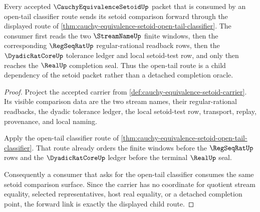 \begin{theorem}
\label{thm:cauchy-equivalence-setoid-open-tail-forward-link}
Every accepted $\CauchyEquivalenceSetoidUp$ packet that is consumed by an open-tail classifier route sends its setoid comparison forward through the displayed route of \autoref{thm:cauchy-equivalence-setoid-open-tail-classifier}. The consumer first reads the two $\StreamNameUp$ finite windows, then the corresponding $\RegSeqRatUp$ regular-rational readback rows, then the $\DyadicRatCoreUp$ tolerance ledger and local setoid-test row, and only then reaches the $\RealUp$ completion seal. Thus the open-tail route is a child dependency of the setoid packet rather than a detached completion oracle.
\end{theorem}
\begin{proof}
Project the accepted carrier from \autoref{def:cauchy-equivalence-setoid-carrier}. Its visible comparison data are the two stream names, their regular-rational readbacks, the dyadic tolerance ledger, the local setoid-test row, transport, replay, provenance, and local naming.

Apply the open-tail classifier route of \autoref{thm:cauchy-equivalence-setoid-open-tail-classifier}. That route already orders the finite windows before the $\RegSeqRatUp$ rows and the $\DyadicRatCoreUp$ ledger before the terminal $\RealUp$ seal.

Consequently a consumer that asks for the open-tail classifier consumes the same setoid comparison surface. Since the carrier has no coordinate for quotient stream equality, selected representatives, host real equality, or a detached completion point, the forward link is exactly the displayed child route.
\end{proof}
